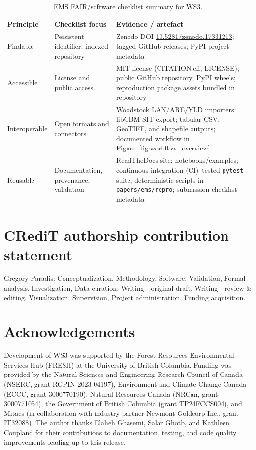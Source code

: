 \documentclass[review]{elsarticle}
\begin{document}
\begin{table}[h]
  \centering
  \caption{EMS FAIR/software checklist summary for WS3.}
  \label{tab:fair-checklist}
  \footnotesize
  \begin{tabular}{p{2.1cm}p{3.4cm}p{6.1cm}}
    \toprule
    Principle & Checklist focus & Evidence / artefact \\
    \midrule
    Findable & Persistent identifier; indexed repository & Zenodo DOI \href{https://doi.org/10.5281/zenodo.17331213}{10.5281/zenodo.17331213}; tagged GitHub releases; PyPI project metadata \\
    Accessible & License and public access & MIT license (CITATION.cff, LICENSE); public GitHub repository; PyPI wheels; reproduction package assets bundled in repository \\
    Interoperable & Open formats and connectors & Woodstock LAN/ARE/YLD importers; libCBM SIT export; tabular CSV, GeoTIFF, and shapefile outputs; documented workflow in Figure~\ref{fig:workflow_overview} \\
    Reusable & Documentation, provenance, validation & ReadTheDocs site; notebooks/examples; continuous-integration (CI)–tested \texttt{pytest} suite; deterministic scripts in \texttt{papers/ems/repro}; submission checklist metadata \\
    \bottomrule
  \end{tabular}
\end{table}

\section*{CRediT authorship contribution statement}
Gregory Paradis: Conceptualization, Methodology, Software, Validation, Formal analysis, Investigation, Data curation, Writing—original draft, Writing—review \& editing, Visualization, Supervision, Project administration, Funding acquisition.

\section*{Acknowledgements}
Development of WS3 was supported by the Forest Resources Environmental Services Hub (FRESH) at the University of British Columbia. Funding was provided by the Natural Sciences and Engineering Research Council of Canada (NSERC, grant RGPIN-2023-04197), Environment and Climate Change Canada (ECCC, grant 3000770190), Natural Resources Canada (NRCan, grant 3000771054), the Government of British Columbia (grant TP24FCCS004), and Mitacs (in collaboration with industry partner Newmont Goldcorp Inc., grant IT32088). The author thanks Elaheh Ghasemi, Salar Ghotb, and Kathleen Coupland for their contributions to documentation, testing, and code quality improvements leading up to this release.
\end{document}
